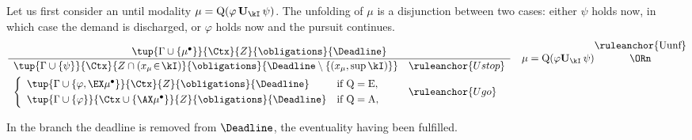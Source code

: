 Let us first consider an until modality $\mu=\mathrm{Q}(\varphi\,\mathbf{U}_\kI\,\psi)$.  The unfolding of $\mu$ is a disjunction between two cases: either $\psi$ holds now, in which case the demand is discharged, or $\varphi$ holds now and the pursuit continues. \vspace{-0.1cm}
\[
\frac{\tup{\Gamma\cup\{\mu^\bullet\}}{\Ctx}{Z}{\obligations}{\Deadline}}
{\begin{array}{ll}
\tup{\Gamma\cup\{\psi\}}{\Ctx}{Z\cap(x_\mu\!\in\!\kI)}{\obligations}{\Deadline\setminus\{(x_\mu,\sup\kI)\}}
  & \ruleanchor{Ustop}\\[4pt]
\left\{
\begin{array}{ll}
\tup{\Gamma\cup\{\varphi,\EX\mu^\bullet\}}{\Ctx}{Z}{\obligations}{\Deadline}
  & \text{if } \mathrm{Q}=\mathrm{E},\\[3pt]
\tup{\Gamma\cup\{\varphi\}}{\Ctx\cup\{\AX\mu^\bullet\}}{Z}{\obligations}{\Deadline}
  & \text{if } \mathrm{Q}=\mathrm{A},
\end{array}
\right.
& \ruleanchor{Ugo}
\end{array}}
\quad
\mu=\mathrm{Q}(\varphi\mathbf{U}_\kI\,\psi)
\shortstack{\ruleanchor{Uunf}\\\ORn
}
\]

In the  branch the deadline is removed from $\Deadline$, the eventuality having been fulfilled.




%

